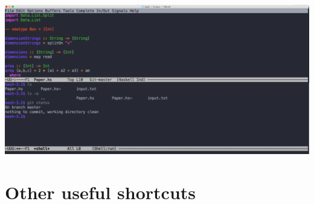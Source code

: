 \documentclass[12pt]{article}
\begin{document}
\begin{center}
\includegraphics[width=7in]{five}
\end{center}

\section{Other useful shortcuts}\label{other-useful-shortcuts}
\end{document}
